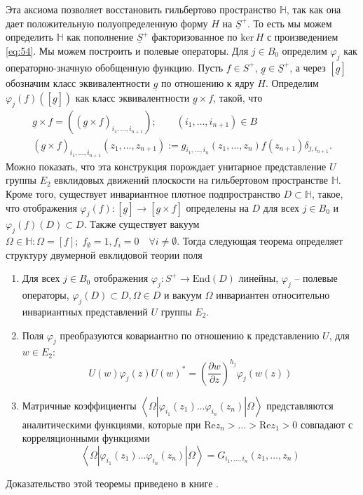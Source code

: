 Эта аксиома позволяет восстановить гильбертово пространство $\mathbb{H}$, так как она дает положительную полуопределенную форму $H$ на $\underline{S}^{+}$. То есть мы можем определить $\mathbb{H}$ как пополнение $\underline{S}^{+}$ факторизованное по $\mathrm{ker}\, H$ с произведением \eqref{eq:54}.
Мы можем построить и полевые операторы. Для $j\in B_{0}$ определим $\varphi_{j}$ как операторно-значную обобщенную функцию. Пусть $f\in S^{+}$, $\underline{g}\in\underline{S}^{+}$, а через $[\underline{g}]$ обозначим класс эквивалентности $\underline{g}$ по отношению к ядру $H$. Определим $\varphi_{j}(f)([\underline{g}])$ как класс эквивалентности $\underline{g}\times f$, такой, что
\begin{equation}
  \label{eq:55}
  \begin{array}{l}
    \underline{g}\times f=((\underline{g}\times f)_{i_{1},\dots,i_{n+1}});\quad\quad (i_{1},\dots,i_{n+1})\in B\\
    (\underline{g}\times f)_{i_{1},\dots,i_{n+1}}(z_{1},\dots,z_{n+1}):=g_{i_{1},\dots,i_{n}}(z_{1},\dots,z_{n})f(z_{n+1})\delta_{j,i_{n+1}}.
  \end{array}
\end{equation}
Можно показать, что эта конструкция порождает унитарное представление $U$ группы $E_{2}$ евклидовых движений плоскости на гильбертовом пространстве $\mathbb{H}$. Кроме того, существует инвариантное плотное подпространство $D\subset \mathbb{H}$, такое, что отображения $\varphi_{j}(f):[\underline{g}]\to [\underline{g}\times f]$ определены на $D$ для всех $j\in B_{0}$ и $\varphi_{j}(f)(D)\subset D$. Также существует вакуум $\Omega\in\mathbb{H}: \Omega=[f];\; f_{\emptyset}=1, f_{i}=0\quad \forall i\neq \emptyset$. Тогда
следующая теорема определяет структуру двумерной евклидовой теории поля
\begin{theorem}
  \begin{enumerate}
  \item Для всех $j\in B_{0}$ отображения $\varphi_{j}:S^{+}\to \mathrm{End}(D)$ линейны, $\varphi_{j}$ -- полевые операторы, $\varphi_{j}(D)\subset D, \Omega\in D$ и вакуум $\Omega$ инвариантен относительно инвариантных представлений $U$ группы $E_{2}$.
  \item Поля $\varphi_{j}$ преобразуются ковариантно по отношению к представлению $U$, для $w\in E_{2}$:
    \begin{equation}
      \label{eq:57}
      U(w)\varphi_{j}(z)U(w)^{*}=\left(\frac{\partial w}{\partial z}\right)^{h_{j}}\varphi_{j}(w(z))
    \end{equation}
  \item Матричные коэффициенты $\left<\Omega|\varphi_{i_{1}}(z_{1})\dots \varphi_{i_{n}}(z_{n})|\Omega\right>$ представляются аналитическими функциями, которые при $\mathrm{Re}z_{n}>\dots>\mathrm{Re}z_{1}>0$ совпадают с корреляционными функциями
  \begin{equation}
    \label{eq:56}
    \left<\Omega|\varphi_{i_{1}}(z_{1})\dots \varphi_{i_{n}}(z_{n})|\Omega\right>=G_{i_{1},\dots,i_{n}}(z_{1},\dots,z_{n})
  \end{equation}
  \end{enumerate}
\end{theorem}
Доказательство этой теоремы приведено в книге \cite{schottenloher2008mathematical}.


